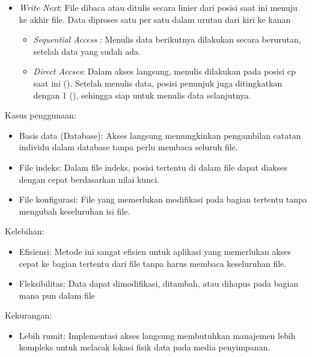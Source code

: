 \documentclass[12pt]{article}
\begin{document}
\begin{enumerate}
\begin{itemize}
\begin{itemize}
        \end{itemize}

        \item \textit{Write Next}: File dibaca atau ditulis secara linier dari posisi saat ini menuju ke akhir file. Data diproses satu per satu dalam urutan dari kiri ke kanan
         \begin{itemize}
        \item \textit{Sequential Access} : Menulis data berikutnya dilakukan secara berurutan, setelah data yang sudah ada.

            
        \item \textit{Direct Accses}: Dalam akses langsung, menulis dilakukan pada posisi cp saat ini (). Setelah menulis data, posisi penunjuk juga ditingkatkan dengan 1 (), sehingga siap untuk menulis data selanjutnya.
        
        \end{itemize}

    \end{itemize}

    {Kasus penggunaan:}
     \begin{itemize}
        \item Basis data (Database): Akses langsung memungkinkan pengambilan catatan individu dalam database tanpa perlu membaca seluruh file.

        \item File indeks: Dalam file indeks, posisi tertentu di dalam file dapat diakses dengan cepat berdasarkan nilai kunci.

        \item File konfigurasi: File yang memerlukan modifikasi pada bagian tertentu tanpa mengubah keseluruhan isi file.


    \end{itemize}

    {Kelebihan:}
     \begin{itemize}
        \item Efisiensi: Metode ini sangat efisien untuk aplikasi yang memerlukan akses cepat ke bagian tertentu dari file tanpa harus membaca keseluruhan file.

        \item Fleksibilitas: Data dapat dimodifikasi, ditambah, atau dihapus pada bagian mana pun dalam file
    \end{itemize}

    {Kekurangan:}
     \begin{itemize}
        \item Lebih rumit: Implementasi akses langsung membutuhkan manajemen lebih kompleks untuk melacak lokasi fisik data pada media penyimpanan.


\end{itemize}
\end{enumerate}
\end{document}
